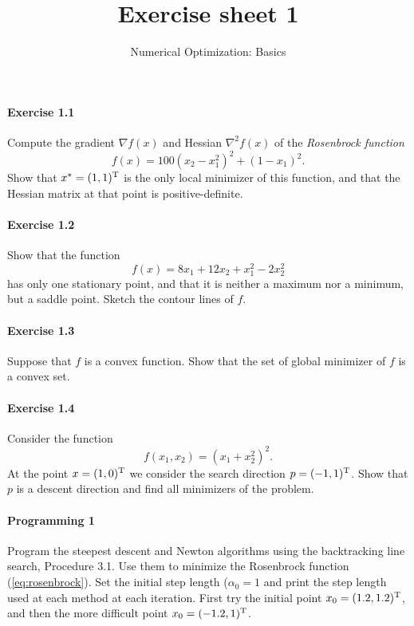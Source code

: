 
\title{Exercise sheet 1}
\subtitle{Numerical Optimization: Basics}
\usepackage{amsmath}
\newcommand\tp{\ensuremath{\text{\upshape T}}}

\maketitle

\paragraph{Exercise 1.1} %
Compute  the gradient $\nabla f(x)$ and Hessian $\nabla^2f(x)$ of the
\emph{Rosenbrock function}
\begin{equation}\label{eq:rosenbrock}
  f(x) = 100(x_2-x_1^2)^2 + (1-x_1)^2.
\end{equation}
Show that $x^*=(1,1)^\tp$ is the only local minimizer of this function, and
that the Hessian matrix at that point is positive-definite.

\paragraph{Exercise 1.2} %
Show that the function
\[
  f(x) = 8x_1 + 12x_2 + x_1^2 - 2x_2^2
\]
has only one stationary point, and that it is neither a maximum nor a minimum,
but a saddle point. Sketch the contour lines of $f$.

\paragraph{Exercise 1.3} %
Suppose that $f$ is a convex function. Show that the set of global minimizer
of $f$ is a convex set.

\paragraph{Exercise 1.4} %
Consider the function
\[
  f(x_1, x_2) = (x_1+x_2^2)^2.
\]
At the point $x=(1,0)^\tp$ we consider the search direction $p=(-1,1)^\tp$.
Show that $p$ is a descent direction and find all minimizers of the problem.

\paragraph{Programming 1}  %
Program the steepest descent and Newton algorithms using the backtracking line
search, Procedure 3.1. Use them to minimize the Rosenbrock function
(\ref{eq:rosenbrock}). Set the initial step length ($\alpha_0=1$ and print the
step length used at each method at each iteration. First try the initial point
$x_0=(1.2, 1.2)^\tp$, and then the more difficult point $x_0=(-1.2, 1)^\tp$.



